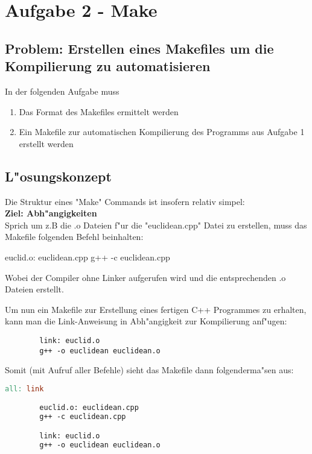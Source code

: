 \documentclass[a4paper,11pt,titlepage]{article}
\begin{document}
    \section{Aufgabe 2 - Make}

    \subsection{Problem: Erstellen eines Makefiles um die Kompilierung zu automatisieren}
    In der folgenden Aufgabe muss
    \begin{enumerate}
        \item Das Format des Makefiles ermittelt werden
        \item Ein Makefile zur automatischen Kompilierung des Programms aus Aufgabe 1 erstellt werden
    \end{enumerate}

    \subsection{L"osungskonzept}
    Die Struktur eines "Make" Commands ist insofern relativ simpel: \\
    \textbf{Ziel: Abh"angigkeiten} \\
    Sprich um z.B die .o Dateien f"ur die "euclidean.cpp" Datei zu erstellen, muss das Makefile folgenden Befehl beinhalten: \\
    \begin{listing}
        euclid.o: euclidean.cpp
        g++ -c euclidean.cpp
    \end{listing}
    Wobei der Compiler ohne Linker aufgerufen wird und die entsprechenden .o Dateien erstellt.

    Um nun ein Makefile zur Erstellung eines fertigen C++ Programmes zu erhalten, kann man die Link-Anweisung in Abh"angigkeit zur Kompilierung anf"ugen: \\
    \begin{lstlisting}
        link: euclid.o
        g++ -o euclidean euclidean.o
    \end{lstlisting}

    Somit (mit Aufruf aller Befehle) sieht das Makefile dann folgenderma"sen aus: \\
    \begin{lstlisting}[language=make, caption=Makefile]
        all: link

        euclid.o: euclidean.cpp
        g++ -c euclidean.cpp

        link: euclid.o
        g++ -o euclidean euclidean.o
    \end{lstlisting}
\end{document}
